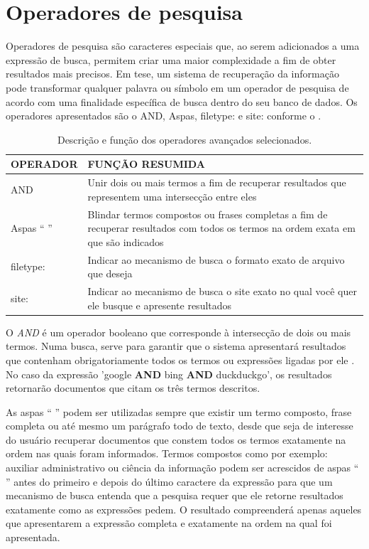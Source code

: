 \documentclass[portuguese]{textolivre}
\begin{document}
\section{Operadores de pesquisa}\label{sec-fmt-manuscrito}
Operadores de pesquisa são caracteres especiais que, ao serem adicionados a uma expressão de busca, permitem criar uma maior complexidade a fim de obter resultados mais precisos. Em tese, um sistema de recuperação da informação pode transformar qualquer palavra ou símbolo em um operador de pesquisa de acordo com uma finalidade específica de busca dentro do seu banco de dados. Os operadores apresentados são o AND, Aspas, filetype: e site: conforme o .

\begin{table}[h!]
\centering
\begin{threeparttable}
\caption{Descrição e função dos operadores avançados selecionados.}
\label{tab01}
\begin{tabular}{p{4.0cm} p{8.0cm}}
\toprule
\textbf{OPERADOR} & \textbf{FUNÇÃO RESUMIDA} \\
 \midrule
AND & Unir dois ou mais termos a fim de recuperar resultados que representem uma intersecção entre eles \\
Aspas “ ” & Blindar termos compostos ou frases completas a fim de recuperar resultados com todos os termos na ordem exata em que são indicados \\
filetype: & Indicar ao mecanismo de busca o formato exato de arquivo que deseja \\
site: & Indicar ao mecanismo de busca o site exato no qual você quer ele busque e apresente resultados \\
\bottomrule
\end{tabular}
\end{threeparttable}
\end{table}

O \textit{AND} é um operador booleano que corresponde à intersecção de dois ou mais termos. Numa busca, serve para garantir que o sistema apresentará resultados que contenham obrigatoriamente todos os termos ou expressões ligadas por ele \cite{picalho_logica_2022}. No caso da expressão 'google \textbf{AND} bing \textbf{AND} duckduckgo', os resultados retornarão documentos que citam os três termos descritos.

As aspas “ ” podem ser utilizadas sempre que existir um termo composto, frase completa ou até mesmo um parágrafo todo de texto, desde que seja de interesse do usuário recuperar documentos que constem todos os termos exatamente na ordem nas quais foram informados. Termos compostos como por exemplo: auxiliar administrativo ou ciência da informação podem ser acrescidos de aspas “ ” antes do primeiro e depois do último caractere da expressão para que um mecanismo de busca entenda que a pesquisa requer que ele retorne resultados exatamente como as expressões pedem. O resultado compreenderá apenas aqueles que apresentarem a expressão completa e exatamente na ordem na qual foi apresentada.
\end{document}
